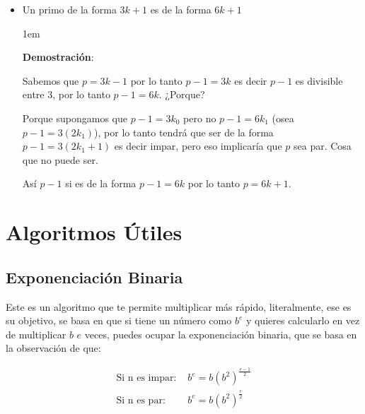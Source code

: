 \documentclass[12pt, fleqn]{report}                             %
\newenvironment{SmallIndentation}[1][0.75em]                    %
    {\begin{adjustwidth}{#1}{}\begin{footnotesize}}                 %
    {\end{footnotesize}\end{adjustwidth}}                           %
\begin{document}
\begin{itemize}
            \item
                Un primo de la forma $3k+1$ es de la forma $6k+1$

                \begin{SmallIndentation}[1em]
                    \textbf{Demostración}:

                    Sabemos que $p = 3k-1$ por lo tanto $p-1 = 3k$ es decir $p-1$ es divisible entre
                    3, por lo tanto $p-1 = 6k$.
                    ¿Porque?

                    Porque supongamos que $p-1=3k_0$ pero no $p-1=6k_1$ (osea $p-1=3(2k_1)$), por lo
                    tanto tendrá que ser de la forma $p-1=3(2k_1+1)$ es decir impar, pero eso
                    implicaría que $p$ sea par. Cosa que no puede ser.

                    Así $p-1$ si es de la forma $p-1=6k$ por lo tanto $p = 6k+1$. 

                \end{SmallIndentation}

        \end{itemize}


\chapter{Algoritmos Útiles}
    \clearpage

    \section{Exponenciación Binaria}

        Este es un algoritmo que te permite multiplicar más rápido, literalmente, ese es 
        su objetivo, se basa en que si tiene un número como $b^e$ y quieres calcularlo
        en vez de multiplicar $b$ $e$ veces, puedes ocupar la exponenciación binaria, 
        que se basa en la observación de que:

        \begin{equation}
        \begin{split}
            \text{Si n es impar: }  &   b^e = b (b^2)^{\frac{e-1}{2}}   \\
            \text{Si n es par: }    &   b^e = b (b^2)^{\frac{e}{2}}
        \end{split}
        \end{equation}
\end{document}
